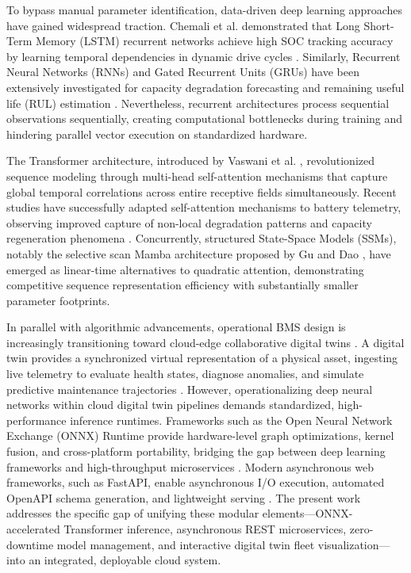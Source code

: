 \documentclass[conference]{IEEEtran}
\begin{document}
To bypass manual parameter identification, data-driven deep learning approaches have gained widespread traction. Chemali et al. demonstrated that Long Short-Term Memory (LSTM) recurrent networks achieve high SOC tracking accuracy by learning temporal dependencies in dynamic drive cycles \cite{Chemali2018}. Similarly, Recurrent Neural Networks (RNNs) and Gated Recurrent Units (GRUs) have been extensively investigated for capacity degradation forecasting and remaining useful life (RUL) estimation \cite{Li2021}. Nevertheless, recurrent architectures process sequential observations sequentially, creating computational bottlenecks during training and hindering parallel vector execution on standardized hardware.

The Transformer architecture, introduced by Vaswani et al. \cite{Vaswani2017}, revolutionized sequence modeling through multi-head self-attention mechanisms that capture global temporal correlations across entire receptive fields simultaneously. Recent studies have successfully adapted self-attention mechanisms to battery telemetry, observing improved capture of non-local degradation patterns and capacity regeneration phenomena \cite{Shen2022}. Concurrently, structured State-Space Models (SSMs), notably the selective scan Mamba architecture proposed by Gu and Dao \cite{Gu2023}, have emerged as linear-time alternatives to quadratic attention, demonstrating competitive sequence representation efficiency with substantially smaller parameter footprints.

In parallel with algorithmic advancements, operational BMS design is increasingly transitioning toward cloud-edge collaborative digital twins \cite{Karnehm2023, Dharani2026}. A digital twin provides a synchronized virtual representation of a physical asset, ingesting live telemetry to evaluate health states, diagnose anomalies, and simulate predictive maintenance trajectories \cite{Ghosh2025}. However, operationalizing deep neural networks within cloud digital twin pipelines demands standardized, high-performance inference runtimes. Frameworks such as the Open Neural Network Exchange (ONNX) Runtime provide hardware-level graph optimizations, kernel fusion, and cross-platform portability, bridging the gap between deep learning frameworks and high-throughput microservices \cite{ONNX2021}. Modern asynchronous web frameworks, such as FastAPI, enable asynchronous I/O execution, automated OpenAPI schema generation, and lightweight serving \cite{FastAPI2018}. The present work addresses the specific gap of unifying these modular elements---ONNX-accelerated Transformer inference, asynchronous REST microservices, zero-downtime model management, and interactive digital twin fleet visualization---into an integrated, deployable cloud system.
\end{document}
